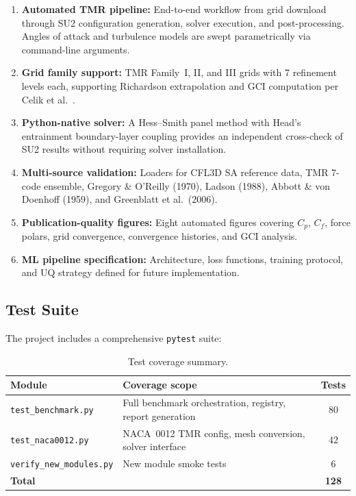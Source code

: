 \documentclass[11pt,a4paper]{article}
\begin{document}
\begin{enumerate}
  \item \textbf{Automated TMR pipeline:} End-to-end workflow from grid
    download through SU2 configuration generation, solver execution,
    and post-processing.  Angles of attack and turbulence models are
    swept parametrically via command-line arguments.
  \item \textbf{Grid family support:} TMR Family~I, II, and III grids
    with 7 refinement levels each, supporting Richardson extrapolation
    and GCI computation per Celik et al.~\cite{CelikEtAl2008}.
  \item \textbf{Python-native solver:} A Hess--Smith panel method with
    Head's entrainment boundary-layer coupling provides an independent
    cross-check of SU2 results without requiring solver installation.
  \item \textbf{Multi-source validation:} Loaders for CFL3D SA reference
    data, TMR 7-code ensemble, Gregory \& O'Reilly (1970), Ladson (1988),
    Abbott \& von Doenhoff (1959), and Greenblatt et al.\ (2006).
  \item \textbf{Publication-quality figures:} Eight automated figures
    covering $C_p$, $C_f$, force polars, grid convergence, convergence
    histories, and GCI analysis.
  \item \textbf{ML pipeline specification:} Architecture, loss functions,
    training protocol, and UQ strategy defined for future implementation.
\end{enumerate}

\subsection{Test Suite}

The project includes a comprehensive \texttt{pytest} suite:

\begin{table}[!ht]
\centering
\caption{Test coverage summary.}
\begin{tabular}{llc}
\toprule
\textbf{Module} & \textbf{Coverage scope} & \textbf{Tests} \\
\midrule
\texttt{test\_benchmark.py}  & Full benchmark orchestration,
  registry, report generation & 80 \\
\texttt{test\_naca0012.py}   & NACA~0012 TMR config, mesh
  conversion, solver interface & 42 \\
\texttt{verify\_new\_modules.py} & New module smoke tests & 6 \\
\midrule
\multicolumn{2}{l}{\textbf{Total}} & \textbf{128} \\
\bottomrule
\end{tabular}
\end{table}
\end{document}
